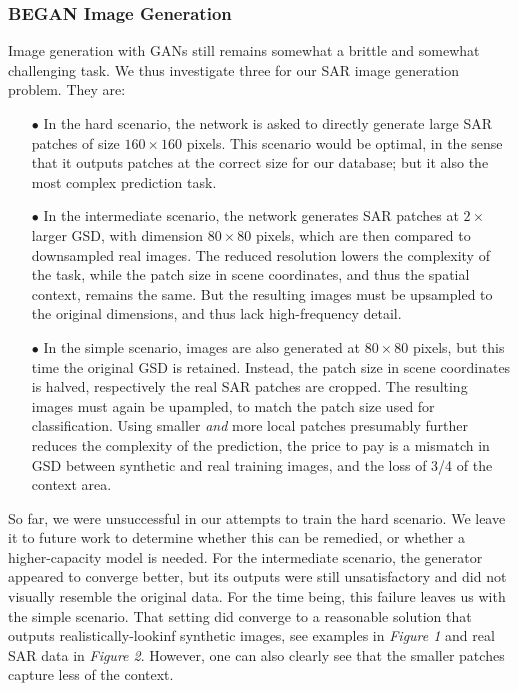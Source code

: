 \documentclass{article}
\begin{document}
\subsubsection{BEGAN Image Generation}

Image generation with GANs still remains somewhat a brittle and
somewhat challenging task. We thus investigate three for our SAR image
generation problem. They are:

\begin{itemize}

  \vspace{-0.33em}
  \item[$\bullet$] In the hard scenario, the network is asked to
    directly generate large SAR patches of size $160 \times 160$
    pixels. This scenario would be optimal, in the sense that it
    outputs patches at the correct size for our database; but it also
    the most complex prediction task.

  \vspace{-0.33em}
  \item[$\bullet$] In the intermediate scenario, the network generates
    SAR patches at $2\times$ larger GSD, with dimension $80 \times 80$
    pixels, which are then compared to downsampled real images. The
    reduced resolution lowers the complexity of the task, while the
    patch size in scene coordinates, and thus the spatial context,
    remains the same. But the resulting images must be upsampled to
    the original dimensions, and thus lack high-frequency detail.

  \vspace{-0.33em}
  \item[$\bullet$] In the simple scenario, images are also generated
    at $80 \times 80$ pixels, but this time the original GSD is
    retained. Instead, the patch size in scene coordinates is halved,
    respectively the real SAR patches are cropped. The resulting
    images must again be upampled, to match the patch size used for
    classification. Using smaller \emph{and} more local patches
    presumably further reduces the complexity of the prediction, the
    price to pay is a mismatch in GSD between synthetic and real
    training images, and the loss of 3/4 of the context area.

\end{itemize}

\noindent
So far, we were unsuccessful in our attempts to train the hard
scenario. We leave it to future work to determine whether this can be
remedied, or whether a higher-capacity model is needed.
%
For the intermediate scenario, the generator appeared to converge
better, but its outputs were still unsatisfactory and did not visually
resemble the original data.
%
For the time being, this failure leaves us with the simple
scenario. That setting did converge to a reasonable solution that
outputs realistically-lookinf synthetic images, see examples in
\textit{Figure 1} and real SAR data in \textit{Figure
  2}.
%
However, one can also clearly see that the smaller patches capture
less of the context.
\end{document}
